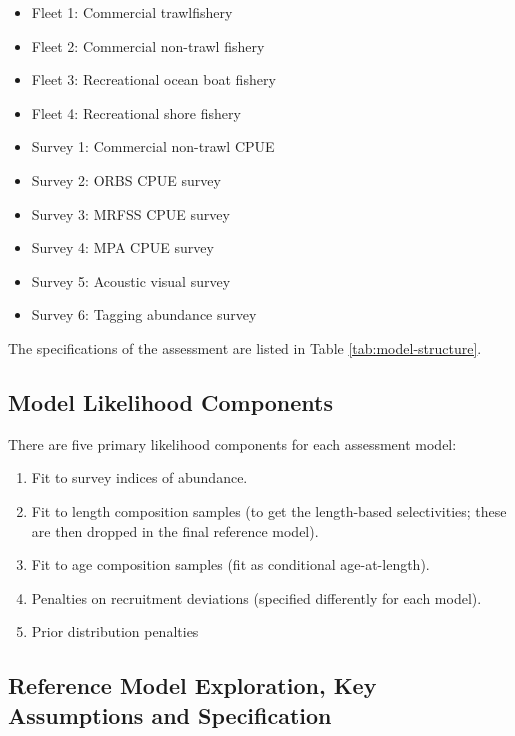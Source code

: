 \documentclass[11pt,
  letterpaper,
]{article}
\providecommand{\tightlist}{%
  \setlength{\itemsep}{0pt}\setlength{\parskip}{0pt}}
\providecommand{\tightlist}{%
  \setlength{\itemsep}{0pt}\setlength{\parskip}{0pt}}
\begin{document}
\begin{itemize}
\tightlist
\item
  Fleet 1: Commercial trawlfishery
\item
  Fleet 2: Commercial non-trawl fishery
\item
  Fleet 3: Recreational ocean boat fishery
\item
  Fleet 4: Recreational shore fishery
\item
  Survey 1: Commercial non-trawl CPUE\\
\item
  Survey 2: ORBS CPUE survey
\item
  Survey 3: MRFSS CPUE survey
\item
  Survey 4: MPA CPUE survey
\item
  Survey 5: Acoustic visual survey
\item
  Survey 6: Tagging abundance survey
\end{itemize}

The specifications of the assessment are listed in Table \ref{tab:model-structure}.

\hypertarget{model-likelihood-components}{%
\subsection{Model Likelihood Components}\label{model-likelihood-components}}

There are five primary likelihood components for each assessment model:

\begin{enumerate}
\def\labelenumi{\arabic{enumi}.}
\tightlist
\item
  Fit to survey indices of abundance.
\item
  Fit to length composition samples (to get the length-based selectivities; these are then dropped in the final reference model).
\item
  Fit to age composition samples (fit as conditional age-at-length).\\
\item
  Penalties on recruitment deviations (specified differently for each model).
\item
  Prior distribution penalties
\end{enumerate}

\hypertarget{reference-model-exploration-key-assumptions-and-specification}{%
\subsection{Reference Model Exploration, Key Assumptions and Specification}\label{reference-model-exploration-key-assumptions-and-specification}}
\end{document}
